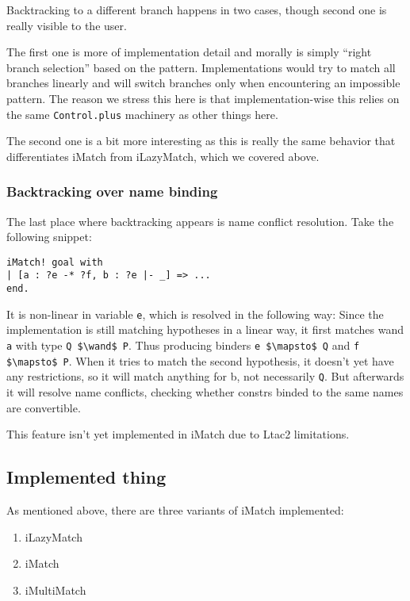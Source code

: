 Backtracking to a different branch happens in two cases, though second one is really visible to the user.

The first one is more of implementation detail and morally is simply ``right branch selection'' based on the pattern.
Implementations would try to match all branches linearly and will switch branches only when encountering an impossible pattern.
The reason we stress this here is that implementation-wise this relies on the same \verb|Control.plus| machinery as other things here.

The second one is a bit more interesting as this is really the same behavior that differentiates iMatch from iLazyMatch, which we covered above.

\subsubsection{Backtracking over name binding}

The last place where backtracking appears is name conflict resolution.
Take the following snippet:

\begin{lstlisting}[language=caml]
iMatch! goal with
| [a : ?e -* ?f, b : ?e |- _] => ...
end.
\end{lstlisting}

It is non-linear in variable \verb|e|, which is resolved in the following way:
Since the implementation is still matching hypotheses in a linear way, it first matches wand \verb|a| with type \verb|Q $\wand$ P|.
Thus producing binders \verb|e $\mapsto$ Q| and \verb|f $\mapsto$ P|.
When it tries to match the second hypothesis, it doesn't yet have any restrictions, so it will match anything for b, not necessarily \verb|Q|.
But afterwards it will resolve name conflicts, checking whether constrs binded to the same names are convertible.

This feature isn't yet implemented in iMatch due to Ltac2 limitations.

\subsection{Implemented thing}

As mentioned above, there are three variants of iMatch implemented:
\begin{enumerate}
\item iLazyMatch
\item iMatch
\item iMultiMatch
\end{enumerate}

